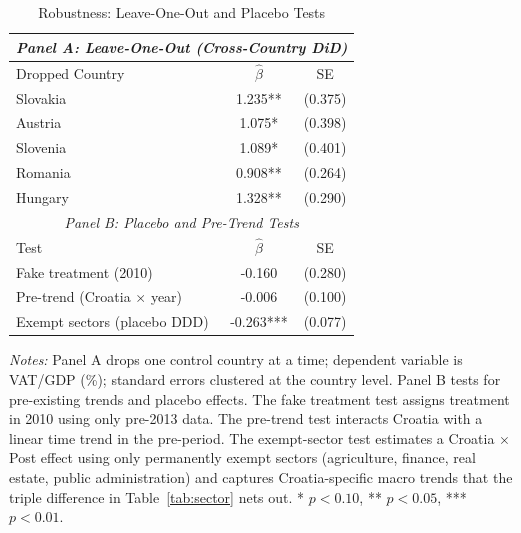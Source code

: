 \begin{table}[htbp]
\centering
\caption{Robustness: Leave-One-Out and Placebo Tests}
\label{tab:robustness}
\begin{tabular}{lcc}
\hline\hline
\multicolumn{3}{c}{\textit{Panel A: Leave-One-Out (Cross-Country DiD)}} \\
\hline
Dropped Country & $\hat{\beta}$ & SE \\
\hline
Slovakia & 1.235** & (0.375) \\
Austria & 1.075* & (0.398) \\
Slovenia & 1.089* & (0.401) \\
Romania & 0.908** & (0.264) \\
Hungary & 1.328** & (0.290) \\
\hline
\multicolumn{3}{c}{\textit{Panel B: Placebo and Pre-Trend Tests}} \\
\hline
Test & $\hat{\beta}$ & SE \\
\hline
Fake treatment (2010) & -0.160 & (0.280) \\
Pre-trend (Croatia $\times$ year) & -0.006 & (0.100) \\
Exempt sectors (placebo DDD) & -0.263*** & (0.077) \\
\hline\hline
\end{tabular}
\begin{tablenotes}[flushleft]
\footnotesize
\item \textit{Notes:} Panel A drops one control country at a time; dependent variable is VAT/GDP (\%); standard errors clustered at the country level. Panel B tests for pre-existing trends and placebo effects. The fake treatment test assigns treatment in 2010 using only pre-2013 data. The pre-trend test interacts Croatia with a linear time trend in the pre-period. The exempt-sector test estimates a Croatia $\times$ Post effect using only permanently exempt sectors (agriculture, finance, real estate, public administration) and captures Croatia-specific macro trends that the triple difference in Table~\ref{tab:sector} nets out. * $p < 0.10$, ** $p < 0.05$, *** $p < 0.01$.
\end{tablenotes}
\end{table}

